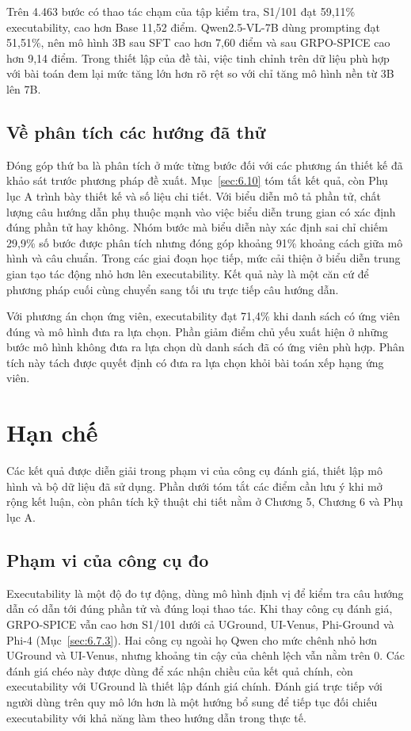Trên 4.463 bước có thao tác chạm của tập kiểm tra, S1/101 đạt 59,11\% executability, cao hơn Base 11,52 điểm. Qwen2.5-VL-7B dùng prompting đạt 51,51\%, nên mô hình 3B sau SFT cao hơn 7,60 điểm và sau GRPO-SPICE cao hơn 9,14 điểm. Trong thiết lập của đề tài, việc tinh chỉnh trên dữ liệu phù hợp với bài toán đem lại mức tăng lớn hơn rõ rệt so với chỉ tăng mô hình nền từ 3B lên 7B.

\subsection*{Về phân tích các hướng đã thử}

Đóng góp thứ ba là phân tích ở mức từng bước đối với các phương án thiết kế đã khảo sát trước phương pháp đề xuất. Mục~\ref{sec:6.10} tóm tắt kết quả, còn Phụ lục A trình bày thiết kế và số liệu chi tiết. Với biểu diễn mô tả phần tử, chất lượng câu hướng dẫn phụ thuộc mạnh vào việc biểu diễn trung gian có xác định đúng phần tử hay không. Nhóm bước mà biểu diễn này xác định sai chỉ chiếm 29,9\% số bước được phân tích nhưng đóng góp khoảng 91\% khoảng cách giữa mô hình và câu chuẩn. Trong các giai đoạn học tiếp, mức cải thiện ở biểu diễn trung gian tạo tác động nhỏ hơn lên executability. Kết quả này là một căn cứ để phương pháp cuối cùng chuyển sang tối ưu trực tiếp câu hướng dẫn.

Với phương án chọn ứng viên, executability đạt 71,4\% khi danh sách có ứng viên đúng và mô hình đưa ra lựa chọn. Phần giảm điểm chủ yếu xuất hiện ở những bước mô hình không đưa ra lựa chọn dù danh sách đã có ứng viên phù hợp. Phân tích này tách được quyết định có đưa ra lựa chọn khỏi bài toán xếp hạng ứng viên.

\section{Hạn chế}\label{sec:7.2}

Các kết quả được diễn giải trong phạm vi của công cụ đánh giá, thiết lập mô hình và bộ dữ liệu đã sử dụng. Phần dưới tóm tắt các điểm cần lưu ý khi mở rộng kết luận, còn phân tích kỹ thuật chi tiết nằm ở Chương 5, Chương 6 và Phụ lục A.

\subsection{Phạm vi của công cụ đo}\label{sec:7.2.1}

Executability là một độ đo tự động, dùng mô hình định vị để kiểm tra câu hướng dẫn có dẫn tới đúng phần tử và đúng loại thao tác. Khi thay công cụ đánh giá, GRPO-SPICE vẫn cao hơn S1/101 dưới cả UGround, UI-Venus, Phi-Ground và Phi-4 (Mục~\ref{sec:6.7.3}). Hai công cụ ngoài họ Qwen cho mức chênh nhỏ hơn UGround và UI-Venus, nhưng khoảng tin cậy của chênh lệch vẫn nằm trên 0. Các đánh giá chéo này được dùng để xác nhận chiều của kết quả chính, còn executability với UGround là thiết lập đánh giá chính. Đánh giá trực tiếp với người dùng trên quy mô lớn hơn là một hướng bổ sung để tiếp tục đối chiếu executability với khả năng làm theo hướng dẫn trong thực tế.

